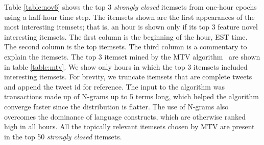 \documentclass[letterpaper,12pt,titlepage,oneside,final]{book}
\begin{document}
Table \ref{table:nov6} shows the top 3 \emph{strongly closed} itemsets
from one-hour epochs
using a half-hour time step.
The itemsets shown are the first appearances of the most interesting itemsets;
that is, an hour is shown only if its top 3 feature novel interesting itemsets. 
The first column is the beginning of the hour, EST time.
The second column is the top itemsets.
The third column is a commentary to explain the itemsets.
The top 3 itemset mined by the MTV algorithm~\cite{mampaey2011tell}  are shown in table \ref{table:mtv}.
% 
We show only hours in which the top 3 itemsets included interesting itemsets. 
For brevity, we truncate itemsets that are complete tweets and append the tweet id for reference.
% 
The input to the algorithm was transactions made up of N-grams up to 5 terms long, 
which helped the algorithm converge faster since the distribution is flatter. 
The use of N-grams also overcomes the dominance of language constructs, 
which are otherwise ranked high in all hours. 
All the topically relevant itemsets chosen by MTV are present in the top 50 \emph{strongly closed} itemsets.
\end{document}
